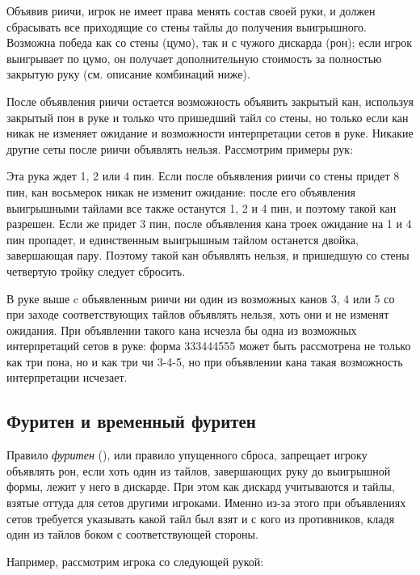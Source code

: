 Объявив риичи, игрок не имеет права менять состав своей руки, и должен сбрасывать все приходящие со стены тайлы до получения выигрышного. Возможна победа как со стены (цумо), так и с чужого дискарда (рон); если игрок выигрывает по цумо, он получает дополнительную стоимость за полностью закрытую руку (см. описание комбинаций ниже). 

После объявления риичи остается возможность объявить закрытый кан, используя закрытый пон в руке и только что пришедший тайл со стены, но только если кан никак не изменяет ожидание и возможности интерпретации сетов в руке. Никакие другие сеты после риичи объявлять нельзя. Рассмотрим примеры рук:


Эта рука ждет 1, 2 или 4 пин. Если после объявления риичи со стены придет 8 пин, кан восьмерок никак не изменит ожидание: после его объявления выигрышными тайлами все также останутся 1, 2 и 4 пин, и поэтому такой кан разрешен. Если же придет 3 пин, после объявления кана троек ожидание на 1 и 4 пин пропадет, и единственным выигрышным тайлом останется двойка, завершающая пару. Поэтому такой кан объявлять нельзя, и пришедшую со стены четвертую тройку следует сбросить. 


В руке выше c объявленным риичи ни один из возможных канов 3, 4 или 5 со при заходе соответствующих тайлов объявлять нельзя, хоть они и не изменят ожидания. При объявлении такого кана исчезла бы одна из возможных интерпретаций сетов в руке: форма 333444555 может быть рассмотрена не только как три пона, но и как три чи 3-4-5, но при объявлении кана такая возможность интерпретации исчезает. 

\subsection{Фуритен и временный фуритен}

Правило \textit{фуритен} (), или правило упущенного сброса, запрещает игроку объявлять рон, если хоть один из тайлов, завершающих руку до выигрышной формы, лежит у него в дискарде. При этом как дискард учитываются и тайлы, взятые оттуда для сетов другими игроками. Именно из-за этого при объявлениях сетов требуется указывать какой тайл был взят и с кого из противников, кладя один из тайлов боком с соответствующей стороны.

Например, рассмотрим игрока со следующей рукой:

